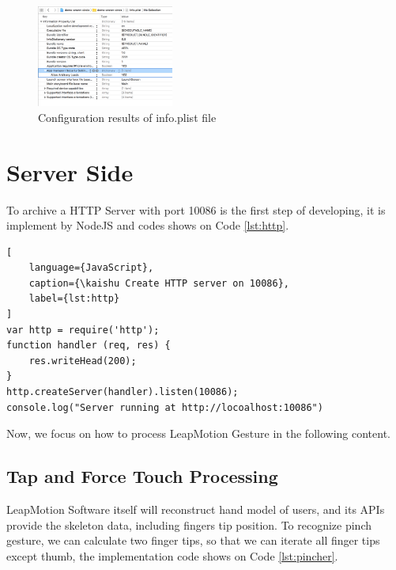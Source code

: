 \begin{figure}[H]
    \kaishu
    \centering
    \includegraphics[width=0.4\textwidth]{figures/config}
    \caption{\kaishu Configuration results of info.plist file} %
    \label{fig:config}
\end{figure}

\section{Server Side}
To archive a HTTP Server with port 10086 is the first step of developing, it is implement by NodeJS and codes shows on Code \ref{lst:http}.
\begin{lstlisting}[
    language={JavaScript},
    caption={\kaishu Create HTTP server on 10086},
    label={lst:http}
]
var http = require('http');
function handler (req, res) {
    res.writeHead(200);
}
http.createServer(handler).listen(10086);
console.log("Server running at http://locoalhost:10086")
\end{lstlisting}

Now, we focus on how to process LeapMotion Gesture in the following content.

\subsection{Tap and Force Touch Processing}

LeapMotion Software itself will reconstruct hand model of users, and its APIs provide the skeleton data, including fingers tip position.
To recognize pinch gesture, we can calculate two finger tips, so that we can iterate all finger tips except thumb, the implementation code shows on Code \ref{lst:pincher}.

